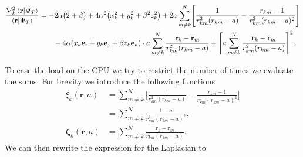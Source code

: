 \documentclass[
    a4paper, aps, twocolumn, floatfix, superscriptaddress]{revtex4-1}
\newcommand{\vf}{\mathbf}
\newcommand{\vfg}{\boldsymbol}
\newcommand{\1}{\mathds{1}}
\begin{document}
            \begin{widetext}
                \begin{align}
                    \frac{\nabla_k^2\bra{\vf{r}}\ket{\Psi_T}}
                    {\bra{\vf{r}}\ket{\Psi_T}}
                    &=
                    -2\alpha
                    \big(
                        2 + \beta
                    \bigr)
                    + 4\alpha^2
                    \bigl(
                        x_k^2 + y_k^2 + \beta^2z_k^2
                    \bigr)
                    +
                    2a
                    \sum_{m \neq k}^N
                    \Biggl[
                        \frac{1}{r_{km}^2(r_{km} - a)}
                        - \frac{r_{km} - 1}{r_{km}^2(r_{km} - a)^2}
                    \Biggr]
                    \nonumber \\
                    &\qquad
                    -4\alpha(x_k\vf{e}_i + y_k\vf{e}_j + \beta z_k\vf{e}_k)
                    \cdot
                    a\sum_{m \neq k}^N
                    \frac{\vf{r}_k - \vf{r}_m}{r_{km}^2(r_{km} - a)}
                    + \Biggl[
                        a\sum_{m \neq k}^N
                        \frac{\vf{r}_k - \vf{r}_m}{r_{km}^2(r_{km} - a)}
                    \Biggr]^2.
                \end{align}
            \end{widetext}
            To ease the load on the CPU we try to restrict the number of times
            we evaluate the sums. For brevity we introduce the following
            functions
            \begin{align}
                \xi_k(\vf{r}, a)
                &= \sum_{m \neq k}^N
                \Biggl[
                    \frac{1}{r_{km}^2(r_{km} - a)}
                    - \frac{r_{km} - 1}{r_{km}^2(r_{km} - a)^2}
                \Biggr] \\
                &=
                \sum_{m \neq k}^N
                \frac{1 - a}{r_{km}^2(r_{km} - a)^2}, \\
                \vfg{\zeta}_k(\vf{r}, a)
                &=
                \sum_{m \neq k}^N
                \frac{\vf{r}_k - \vf{r}_m}{r_{km}^2(r_{km} - a)}.
            \end{align}
            We can then rewrite the expression for the Laplacian to
\end{document}
